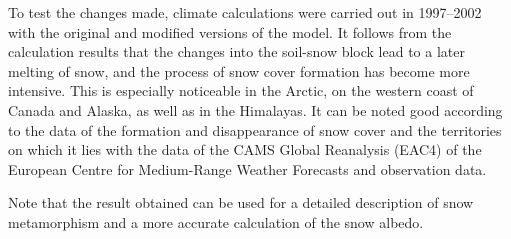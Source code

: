 \documentclass[a4paper, fontsize=12pt]{scrartcl}
\begin{document}
To test the changes made, climate calculations were carried out in 1997--2002 with the original and modified versions of the model. It follows from the calculation results that the changes into the soil-snow block lead to a later melting of snow, and the process of snow cover formation has become more intensive. This is especially noticeable in the Arctic, on the western coast of Canada and Alaska, as well as in the Himalayas. It can be noted good according to the data of the formation and disappearance of snow cover and the territories on which it lies with the data of the CAMS Global Reanalysis (EAC4) of the European Centre for Medium-Range Weather Forecasts and observation data.

Note that the result obtained can be used for a detailed description of snow metamorphism and a more accurate calculation of the snow albedo.
\end{document}
